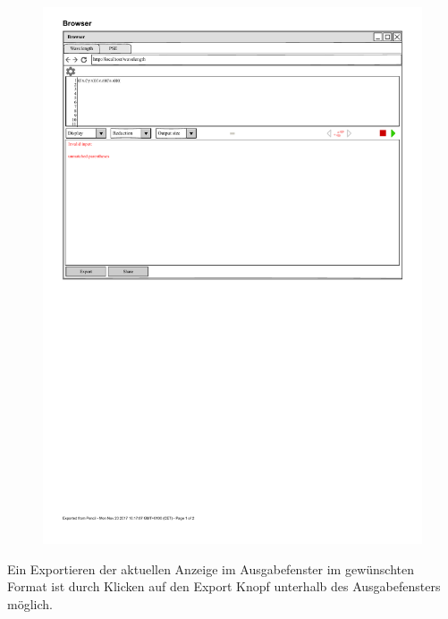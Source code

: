 \documentclass[parskip=full,11pt,twoside]{scrartcl}
\begin{document}
\begin{figure}[H]
	\centering
	\includegraphics[width=\textwidth]{img/fehlerausgabe}
\end{figure}

Ein Exportieren der aktuellen Anzeige im Ausgabefenster im gewünschten Format ist durch Klicken auf den Export Knopf unterhalb des Ausgabefensters möglich. 
\end{document}
